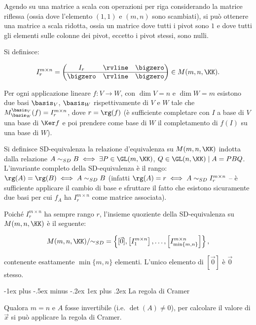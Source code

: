\documentclass[10pt,landscape]{article}
\makeatletter
\renewcommand{\subsubsection}{\@startsection{subsubsection}{3}{0mm}%
	{-1ex plus -.5ex minus -.2ex}%
	{1ex plus .2ex}%
	{\normalfont\small\bfseries}}
\makeatother
\begin{document}
\begin{multicols}{3}
		Agendo
		su una matrice a scala con operazioni per riga considerando
		la matrice riflessa (ossia dove l'elemento $(1, 1)$ e $(m, n)$ sono
		scambiati), si può ottenere una matrice a scala ridotta,
		ossia un matrice dove tutti i pivot sono $1$ e dove tutti
		gli elementi sulle colonne dei pivot, eccetto i pivot stessi,
		sono nulli. %
		
		Si definisce:
		
		\[I^{m \times n}_r =
		\begin{pmatrix}
			I_r
			& \rvline & \bigzero \\
			\hline
			\bigzero & \rvline &
			\bigzero
		\end{pmatrix} \in M(m, n, \KK). \]
		
		Per ogni applicazione lineare $f : V \to W$, con $\dim V = n$ e
		$\dim W = m$ esistono due basi $\basis_V$, $\basis_W$ rispettivamente
		di $V$ e $W$ tale che $M^{\basis_V}_{\basis_W}(f) = I^{m \times n}_r$,
		dove $r=\rg(f)$ (è sufficiente completare con $I$ a base di $V$ una base
		di $\Ker f$ e poi prendere come base di $W$ il completamento di $f(I)$
		su una base di $W$).
		
		Si definisce SD-equivalenza la relazione d'equivalenza su
		$M(m, n, \KK)$ indotta dalla relazione $A \sim_{SD} B \iff \exists P \in
		\GL(m, \KK)$, $Q \in \GL(n, \KK) \mid A=PBQ$. L'invariante completo
		della SD-equivalenza è il rango: $\rg(A) = \rg(B) \iff A \sim_{SD} B$
		(infatti $\rg(A) = r \iff A \sim_{SD} I^{m \times n}_r$ -- è sufficiente
		applicare il cambio di base e sfruttare il fatto che esistono
		sicuramente due basi per cui $f_A$ ha $I^{m \times n}_r$ come
		matrice associata).
		
		Poiché $I^{m \times n}_r$ ha sempre rango $r$, l'insieme
		quoziente della SD-equivalenza su $M(m, n, \KK)$ è il seguente:
		
		\[ M(m, n, \KK)/{\sim_{SD}} = \left\{[\vec{0}], \left[I^{m \times n}_1\right], \ldots, \left[I^{m \times n}_{\min\{m, n\}}\right] \right\}, \]
		
		contenente esattamente $\min\{m, n\}$ elementi. L'unico elemento
		di $[\vec{0}]$ è $\vec{0}$ stesso.
		
		\subsubsection{La regola di Cramer}
		
		Qualora $m=n$ e $A$ fosse invertibile (i.e. $\det(A) \neq 0$),
		per calcolare il valore di $\vec{x}$ si può applicare
		la regola di Cramer.
		

\end{multicols}
\end{document}
